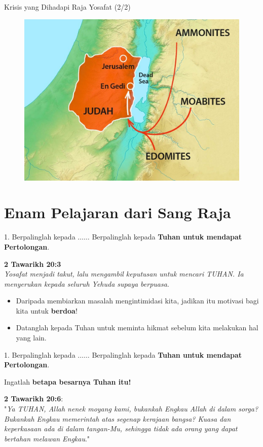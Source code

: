 \documentclass[pdf]{beamer}
\theoremstyle{mystyle}
\begin{document}
\begin{frame}{Krisis yang Dihadapi Raja Yosafat (2/2)}
	\begin{figure}[!ht]
		\centering
		\includegraphics[scale=.27]{jehoshaphat-victory}
\end{figure}		

\end{frame}

\section{Enam Pelajaran dari Sang Raja}
\begin{frame}{1. Berpalinglah kepada $\ldots \ldots$}
	Berpalinglah kepada \textbf{Tuhan untuk mendapat Pertolongan}.
	
	\bigskip
	\textbf{2 Tawarikh 20:3}\\
\textit{	Yosafat menjadi takut, lalu mengambil keputusan untuk mencari TUHAN. Ia menyerukan kepada seluruh Yehuda supaya berpuasa}.
	
	\bigskip	
	
	\begin{itemize}
		\item Daripada membiarkan masalah mengintimidasi kita, jadikan itu motivasi bagi kita untuk \textbf{berdoa}!
		\item Datanglah kepada Tuhan untuk meminta hikmat sebelum kita melakukan hal yang lain.
	\end{itemize}

\end{frame}

\begin{frame}{1. Berpalinglah kepada $\ldots \ldots$}
	Berpalinglah kepada \textbf{Tuhan untuk mendapat Pertolongan}.
	
	\bigskip
	Ingatlah \textbf{betapa besarnya Tuhan itu!}
	
	\bigskip
	\textbf{2 Tawarikh 20:6}: \\
	 "\textit{Ya TUHAN, Allah nenek moyang kami, bukankah Engkau Allah di dalam sorga? Bukankah Engkau memerintah atas segenap kerajaan bangsa? Kuasa dan keperkasaan ada di dalam tangan-Mu, sehingga tidak ada orang yang dapat bertahan melawan Engkau}."	
	
\end{frame}
\end{document}
